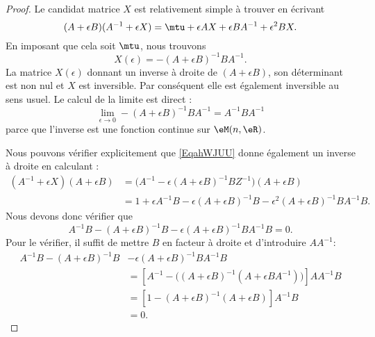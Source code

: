 \begin{proof}
    Le candidat matrice \( X\) est relativement simple à trouver en écrivant
    \begin{equation}
        (A+\epsilon B)(A^{-1}+\epsilon X)=\mtu+\epsilon AX+\epsilon BA^{-1}+\epsilon^2BX.
    \end{equation}
    En imposant que cela soit \( \mtu\), nous trouvons
    \begin{equation}        \label{EqahWJUU}
        X(\epsilon)=-(A+\epsilon B)^{-1} BA^{-1}.
    \end{equation}
    La matrice \( X(\epsilon)\) donnant un inverse à droite de \( (A+\epsilon B)\), son déterminant est non nul et \( X\) est inversible. Par conséquent elle est également inversible au sens usuel. Le calcul de la limite est direct :
    \begin{equation}
        \lim_{\epsilon\to 0}-(A+\epsilon B)^{-1} BA^{-1}=A^{-1} BA^{-1}
    \end{equation}
    parce que l'inverse est une fonction continue sur \( \eM(n,\eR)\).

    Nous pouvons vérifier explicitement que \eqref{EqahWJUU} donne également un inverse à droite en calculant :
    \begin{subequations}
        \begin{align}
            (A^{-1}+\epsilon X)(A+\epsilon B)&=\big( A^{-1}-\epsilon(A+\epsilon B)^{-1} BZ^{-1} \big)(A+\epsilon B)\\
            &=1+\epsilon A^{-1} B-\epsilon(A+\epsilon B)^{-1} B-\epsilon^2(A+\epsilon B)^{-1} BA^{-1} B.
        \end{align}
    \end{subequations}
    Nous devons donc vérifier que
    \begin{equation}
        A^{-1} B-(A+\epsilon B)^{-1}B-\epsilon(A+\epsilon B)^{-1} BA^{-1} B=0.
    \end{equation}
    Pour le vérifier, il suffit de mettre \( B\) en facteur à droite et d'introduire \( AA^{-1}\):
    \begin{subequations}
        \begin{align}
            A^{-1} B-(A+\epsilon B)^{-1}B&-\epsilon(A+\epsilon B)^{-1} BA^{-1} B\\
            &=\left[ A^{-1}-\Big( (A+\epsilon B)^{-1}(A+\epsilon BA^{-1}) \Big) \right]AA^{-1} B\\
            &=\left[ 1-(A+\epsilon B)^{-1}(A+\epsilon B) \right]A^{-1}B\\
            &=0.
        \end{align}
    \end{subequations}
\end{proof}

